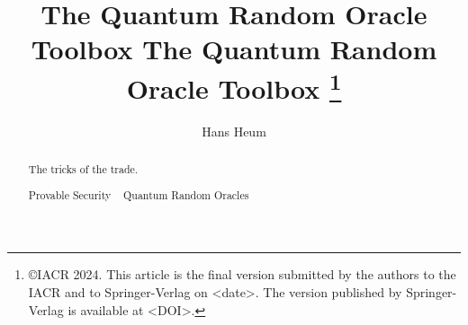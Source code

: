 \title{
  \iffullversion
    The Quantum Random Oracle Toolbox
  \else
    The Quantum Random Oracle Toolbox
    \ifauthversion
    \thanks{
      \copyright IACR 2024. This article is the final version submitted by the authors
      to the IACR and to Springer-Verlag on <date>. The version published
      by Springer-Verlag is available at <DOI>.
    }
    \fi
  \fi
}


\ifsubmission
  \author{
    \vspace*{-5mm}
  }
  \institute{
    \vspace*{-5mm}
  }
\else
   \author{
    Hans Heum  \and
  }

\fi

\maketitle

\begin{abstract}
  The tricks of the trade.

  \begin{keywords}
    Provable Security \textperiodcentered~
    Quantum Random Oracles
  \end{keywords}
\end{abstract}

\ifeprintfull
  \newpage
  \tableofcontents
  \newpage
\fi
